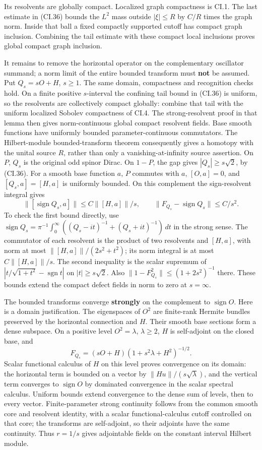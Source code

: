 \documentclass[
  11pt,
]{article}
\begin{document}
Its resolvents are globally compact. Localized graph compactness is
CI.1. The last estimate in (CI.36) bounds the \(L^2\) mass outside
\(|\xi|\leq R\) by \(C/R\) times the graph norm. Inside that ball a
fixed compactly supported cutoff has compact graph inclusion. Combining
the tail estimate with these compact local inclusions proves global
compact graph inclusion.

It remains to remove the horizontal operator on the complementary
oscillator summand; a norm limit of the entire bounded transform must
\textbf{not} be assumed. Put \(Q_s=sO+H\), \(s\geq1\). The same domain,
compactness and recognition checks hold. On a finite positive
\(s\)-interval the confining tail bound in (CI.36) is uniform, so the
resolvents are collectively compact globally: combine that tail with the
uniform localized Sobolev compactness of CI.4. The strong-resolvent
proof in that lemma then gives norm-continuous global compact resolvent
fields. Base smooth functions have uniformly bounded
parameter-continuous commutators. The Hilbert-module bounded-transform
theorem consequently gives a homotopy with the unital source \(R\),
rather than only a vanishing-at-infinity source assertion. On \(P\),
\(Q_s\) is the original odd spinor Dirac. On \(1-P\), the gap gives
\(|Q_s|\geq s\sqrt2\), by (CI.36). For a smooth base function \(a\),
\(P\) commutes with \(a\), \([O,a]=0\), and \([Q_s,a]=[H,a]\) is
uniformly bounded. On this complement the sign-resolvent integral gives
\[
 \|[\operatorname{sign}Q_s,a]\|
       \leq C\|[H,a]\|/s,\qquad
 \|F_{Q_s}-\operatorname{sign}Q_s\|\leq C/s^2.
 \tag{CI.37}
\] To check the first bound directly, use
\(\operatorname{sign}Q_s=\pi^{-1}\int_0^\infty((Q_s-it)^{-1}+(Q_s+it)^{-1})\,dt\)
in the strong sense. The commutator of each resolvent is the product of
two resolvents and \([H,a]\), with norm at most
\(\|[H,a]\|/(2s^2+t^2)\); its norm integral is at most \(C\|[H,a]\|/s\).
The second inequality is the scalar supremum of
\(|t/\sqrt{1+t^2}-\operatorname{sgn}t|\) on \(|t|\geq s\sqrt2\). Also
\(\|1-F_{Q_s}^2\|\leq(1+2s^2)^{-1}\) there. These bounds extend the
compact defect fields in norm to zero at \(s=\infty\).

The bounded transforms converge \textbf{strongly} on the complement to
\(\operatorname{sign}O\). Here is a domain justification. The
eigenspaces of \(O^2\) are finite-rank Hermite bundles preserved by the
horizontal connection and \(H\). Their smooth base sections form a dense
subspace. On a positive level \(O^2=\lambda\), \(\lambda\geq2\), \(H\)
is self-adjoint on the closed base, and \[
 F_{Q_s}=(sO+H)(1+s^2\lambda+H^2)^{-1/2}.
\] Scalar functional calculus of \(H\) on this level proves convergence
on its domain: the horizontal term is bounded on a vector by
\(\|Hu\|/(s\sqrt\lambda)\), and the vertical term converges to
\(\operatorname{sign}O\) by dominated convergence in the scalar spectral
calculus. Uniform bounds extend convergence to the dense sum of levels,
then to every vector. Finite-parameter strong continuity follows from
the common smooth core and resolvent identity, with a scalar
functional-calculus cutoff controlled on that core; the transforms are
self-adjoint, so their adjoints have the same continuity. Thus \(r=1/s\)
gives adjointable fields on the constant interval Hilbert module.
\end{document}
